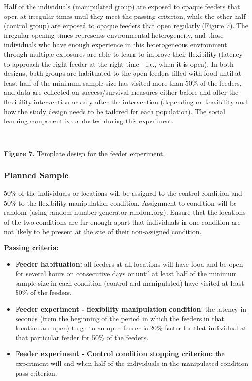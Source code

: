 \documentclass[
]{article}
\providecommand{\tightlist}{%
  \setlength{\itemsep}{0pt}\setlength{\parskip}{0pt}}
\begin{document}
Half of the individuals (manipulated group) are exposed to opaque
feeders that open at irregular times until they meet the passing
criterion, while the other half (control group) are exposed to opaque
feeders that open regularly (Figure 7). The irregular opening times
represents environmental heterogeneity, and those individuals who have
enough experience in this heterogeneous environment through multiple
exposures are able to learn to improve their flexibility (latency to
approach the right feeder at the right time - i.e., when it is open). In
both designs, both groups are habituated to the open feeders filled with
food until at least half of the minimum sample size has visited more
than 50\% of the feeders, and data are collected on success/survival
measures either before and after the flexibility intervention or only
after the intervention (depending on feasibility and how the study
design needs to be tailored for each population). The social learning
component is conducted during this experiment.

~

\textbf{Figure 7.} Template design for the feeder experiment.

\hypertarget{planned-sample-1}{%
\subsubsection{Planned Sample}\label{planned-sample-1}}

50\% of the individuals or locations will be assigned to the control
condition and 50\% to the flexibility manipulation condition. Assignment
to condition will be random (using random number generator random.org).
Ensure that the locations of the two conditions are far enough apart
that individuals in one condition are not likely to be present at the
site of their non-assigned condition.

\textbf{Passing criteria:}

\begin{itemize}
\tightlist
\item
  \textbf{Feeder habituation:} all feeders at all locations will have
  food and be open for several hours on consecutive days or until at
  least half of the minimum sample size in each condition (control and
  manipulated) have visited at least 50\% of the feeders.
\item
  \textbf{Feeder experiment - flexibility manipulation condition:} the
  latency in seconds (from the beginning of the period in which the
  feeders in that location are open) to go to an open feeder is 20\%
  faster for that individual at that particular feeder for 50\% of the
  feeders.
\item
  \textbf{Feeder experiment - Control condition stopping criterion:} the
  experiment will end when half of the individuals in the manipulated
  condition pass criterion.
\end{itemize}
\end{document}
